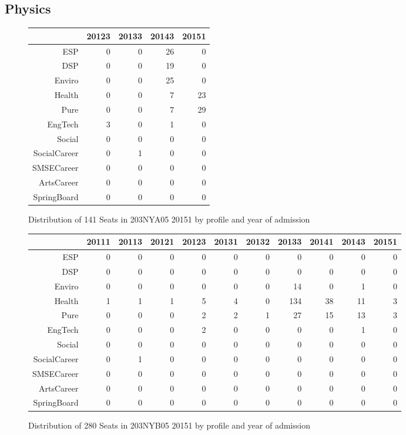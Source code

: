 \documentclass{article}\usepackage[]{graphicx}\usepackage[]{color}
\begin{document}
\subsection{Physics}
\begin{figure}[H]
\centering
\begin{tabular}{rrrrr}
  \hline
 & 20123 & 20133 & 20143 & 20151 \\ 
  \hline
ESP &   0 &   0 &  26 &   0 \\ 
  DSP &   0 &   0 &  19 &   0 \\ 
  Enviro &   0 &   0 &  25 &   0 \\ 
  Health &   0 &   0 &   7 &  23 \\ 
  Pure &   0 &   0 &   7 &  29 \\ 
  EngTech &   3 &   0 &   1 &   0 \\ 
  Social &   0 &   0 &   0 &   0 \\ 
  SocialCareer &   0 &   1 &   0 &   0 \\ 
  SMSECareer &   0 &   0 &   0 &   0 \\ 
  ArtsCareer &   0 &   0 &   0 &   0 \\ 
  SpringBoard &   0 &   0 &   0 &   0 \\ 
   \hline
\end{tabular}
\caption{Distribution of 141 Seats in 203NYA05 20151 by profile and year of admission} 
\end{figure}
\begin{figure}[H]
\centering
\begin{tabular}{rrrrrrrrrrr}
  \hline
 & 20111 & 20113 & 20121 & 20123 & 20131 & 20132 & 20133 & 20141 & 20143 & 20151 \\ 
  \hline
ESP &   0 &   0 &   0 &   0 &   0 &   0 &   0 &   0 &   0 &   0 \\ 
  DSP &   0 &   0 &   0 &   0 &   0 &   0 &   0 &   0 &   0 &   0 \\ 
  Enviro &   0 &   0 &   0 &   0 &   0 &   0 &  14 &   0 &   1 &   0 \\ 
  Health &   1 &   1 &   1 &   5 &   4 &   0 & 134 &  38 &  11 &   3 \\ 
  Pure &   0 &   0 &   0 &   2 &   2 &   1 &  27 &  15 &  13 &   3 \\ 
  EngTech &   0 &   0 &   0 &   2 &   0 &   0 &   0 &   0 &   1 &   0 \\ 
  Social &   0 &   0 &   0 &   0 &   0 &   0 &   0 &   0 &   0 &   0 \\ 
  SocialCareer &   0 &   1 &   0 &   0 &   0 &   0 &   0 &   0 &   0 &   0 \\ 
  SMSECareer &   0 &   0 &   0 &   0 &   0 &   0 &   0 &   0 &   0 &   0 \\ 
  ArtsCareer &   0 &   0 &   0 &   0 &   0 &   0 &   0 &   0 &   0 &   0 \\ 
  SpringBoard &   0 &   0 &   0 &   0 &   0 &   0 &   0 &   0 &   0 &   0 \\ 
   \hline
\end{tabular}
\caption{Distribution of 280 Seats in 203NYB05 20151 by profile and year of admission} 
\end{figure}
\end{document}
